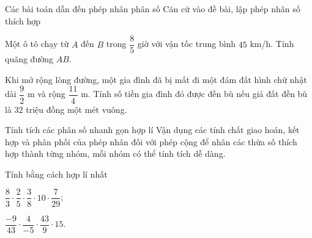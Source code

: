 \begin{dang}{Các bài toán dẫn đến phép nhân phân số}
	Căn cứ vào đề bài, lập phép nhân số thích hợp
\end{dang}
\begin{vd}%
	Một ô tô chạy từ $A$ đến $B$ trong $\dfrac{8}{5}$ giờ với vận tốc trung bình $45$ km/h. Tính quãng đường $AB$.
\end{vd}
\begin{vd}%
	Khi mở rộng lòng đường, một gia đình đã bị mất đi một đám đất hình chữ nhật dài $\dfrac{9}{2}$ m và rộng $\dfrac{11}{4}$ m. Tính số tiền gia đình đó được đền bù nếu giá đất đền bù là $32$ triệu đồng một mét vuông.
\end{vd}
\begin{dang}{Tính tích các phân số nhanh gọn hợp lí}
	Vận dụng các tính chất giao hoán, kết hợp và phân phối của phép nhân đối với phép cộng để nhân các thừa số thích hợp thành từng nhóm, mỗi nhóm có thể tính tích dễ dàng.
\end{dang}
\begin{vd}%
	Tính bằng cách hợp lí nhất
	\begin{enumEX}{2}
		\item $\dfrac{8}{3}\cdot \dfrac{2}{5}\cdot \dfrac{3}{8}\cdot 10\cdot \dfrac{7}{29}$;
		\item $\dfrac{-9}{43}\cdot \dfrac{4}{-5}\cdot \dfrac{43}{9}\cdot 15$.
	\end{enumEX}
\end{vd}
